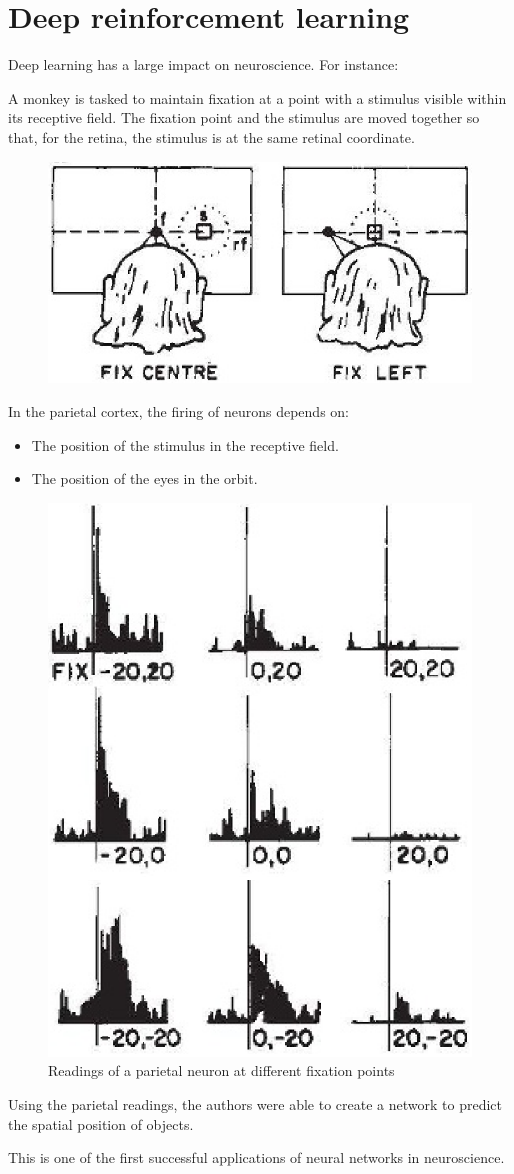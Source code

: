 \chapter{Deep reinforcement learning}


Deep learning has a large impact on neuroscience. For instance:
\begin{casestudy}
    A monkey is tasked to maintain fixation at a point with a stimulus visible within its receptive field. The fixation point and the stimulus are moved together so that, for the retina, the stimulus is at the same retinal coordinate.

    \begin{figure}[H]
        \centering
        \includegraphics[width=0.3\linewidth]{./img/monkey_parietal1.png}
    \end{figure}

    In the parietal cortex, the firing of neurons depends on:
    \begin{itemize}
        \item The position of the stimulus in the receptive field.
        \item The position of the eyes in the orbit.
    \end{itemize}

    \begin{figure}[H]
        \centering
        \includegraphics[width=0.2\linewidth]{./img/monkey_parietal2.png}
        \caption{Readings of a parietal neuron at different fixation points}
    \end{figure}

    Using the parietal readings, the authors were able to create a network to predict the spatial position of objects.
    
    \indenttbox
    \begin{remark}
        This is one of the first successful applications of neural networks in neuroscience.
    \end{remark}
\end{casestudy}


